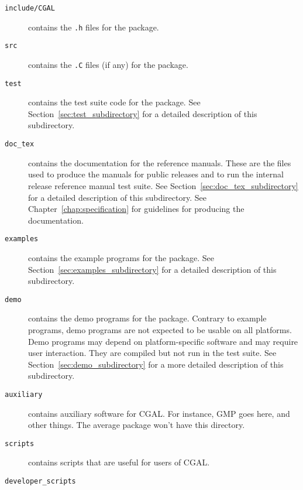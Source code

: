 \begin{description}
  \item[{\tt include/CGAL}]
       contains the {\tt .h} files for the package.
  \item[{\tt src}]
       contains the {\tt .C} files (if any) for the package.
  \item[{\tt test}]
       contains the test suite code for the package.  See
       Section~\ref{sec:test_subdirectory} for a detailed description of this 
       subdirectory.
  \item[{\tt doc\_tex}]
       contains the documentation for the reference manuals.
       These are the files used to produce the manuals for public releases and
       to run the internal release reference manual test suite.
       See Section~\ref{sec:doc_tex_subdirectory} for a detailed description 
       of this subdirectory.
       See Chapter~\ref{chap:specification} for guidelines for producing
       the documentation.
  \item[{\tt examples}]
       contains the example programs for the package.
       See Section~\ref{sec:examples_subdirectory} for a detailed 
       description of this subdirectory.
  \item[{\tt demo}]
       contains the demo programs for the package.
       Contrary to example programs, demo programs are not expected to be
       usable on all platforms. Demo programs may depend on platform-specific
       software and may require user interaction.  They are compiled but not
       run in the test suite. See Section~\ref{sec:demo_subdirectory} for a
       more detailed description of this subdirectory.
  \item[{\tt auxiliary}]
       contains auxiliary software for CGAL. For instance, GMP goes here,
       and other things. The average package won't have this directory.
  \item[{\tt scripts}]
       contains scripts that are useful for users of CGAL.
  \item[{\tt developer\_scripts}]

\end{description}
